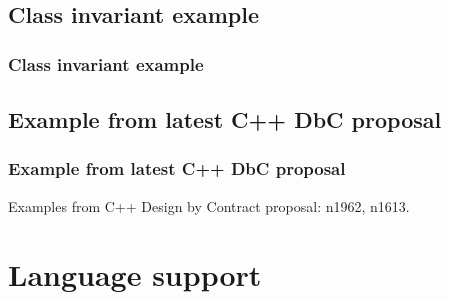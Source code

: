 \documentclass{beamer}
\begin{document}
\subsection{Class invariant example}
\begin{frame}[fragile]
\frametitle{Class invariant example}

\end{frame}

\subsection{Example from latest C++ DbC proposal}
\begin{frame}
\frametitle{Example from latest C++ DbC proposal}

\pause
\begin{block}{}
Examples from C++ Design by Contract proposal: n1962, n1613.
\end{block}
\end{frame}



\section{Language support}
\end{document}
